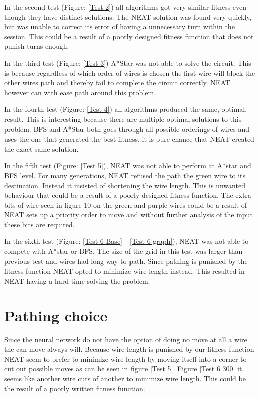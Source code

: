 \documentclass{kththesis}
\begin{document}
In the second test (Figure: \ref{Test 2}) all algorithms got very similar fitness even though they have distinct solutions. The NEAT solution was found very quickly, but was unable to correct its error of having a unnecessary turn within the session. This could be a result of a poorly designed fitness function that does not punish turns enough.
 
In the third test (Figure: \ref{Test 3}) A*Star was not able to solve the circuit. This is because regardless of which order of wires is chosen the first wire will block the other wires path and thereby fail to complete the circuit correctly. NEAT however can with ease path around this problem.
 
In the fourth test (Figure: \ref{Test 4}) all algorithms produced the same, optimal, result. This is interesting because there are multiple optimal solutions to this problem. BFS and A*Star both goes through all possible orderings of wires and uses the one that generated the best fitness, it is pure chance that NEAT created the exact same solution. 
 
In the fifth test (Figure: \ref{Test 5}), NEAT was not able to perform at A*star and BFS level. For many generations, NEAT refused the path the green wire to its destination. Instead it insisted of shortening the wire length. This is unwanted behaviour that could be a result of a poorly designed fitness function. The extra bits of wire seen in figure 10 on the green and purple wires could be a result of NEAT sets up a priority order to move and without further analysis of the input these bits are required.
 
In the sixth test (Figure: \ref{Test 6 Base} - \ref{Test 6 graph}), NEAT was not able to compete with A*star or BFS. The size of the grid in this test was larger than previous test and wires had long way to path. Since pathing is punished by the fitness function NEAT opted to minimize wire length instead. This resulted in NEAT having a hard time solving the problem. 
 
\section{Pathing choice}
Since the neural network do not have the option of doing no move at all a wire the can move always will. Because wire length is punished by our fitness function NEAT seem to prefer to minimize wire length by moving itself into a corner to cut out possible moves as can be seen in figure \ref{Test 5}. Figure \ref{Test 6 300} it seems like another wire cuts of another to minimize wire length. This could be the result of a poorly written fitness function.
 
\end{document}
